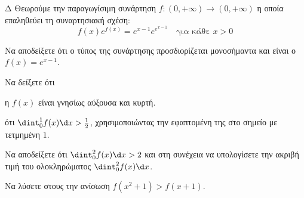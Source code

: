 \begin{thema}{Δ}
Θεωρούμε την παραγωγίσιμη συνάρτηση $f: (0, +\infty) \to (0, +\infty)$ η οποία επαληθεύει τη συναρτησιακή σχέση:
\[ f(x) e^{f(x)} = e^{x-1} e^{e^{x-1}} \quad \text{για κάθε } x > 0 \]
\begin{erwthma}
    \item Να αποδείξετε ότι ο τύπος της συνάρτησης προσδιορίζεται μονοσήμαντα και είναι ο $f(x) = e^{x-1}$. 

    \item Να δείξετε ότι 
\begin{alist}
\item η $f(x)$ είναι γνησίως αύξουσα και κυρτή. 
\item ότι $\dint_0^1 f(x) \d x > \frac{1}{2}$, χρησιμοποιώντας την εφαπτομένη της στο σημείο με τετμημένη $1$.
\end{alist}
    \item Να αποδείξετε ότι $\dint_0^2 f(x) \d x > 2$ και στη συνέχεια να υπολογίσετε την ακριβή τιμή του ολοκληρώματος $\dint_0^2 f(x) \d x$. 
    \item Να λύσετε στους την ανίσωση $f(x^2 + 1) > f(x + 1)$. 
\end{erwthma}
\end{thema}

\newpage
